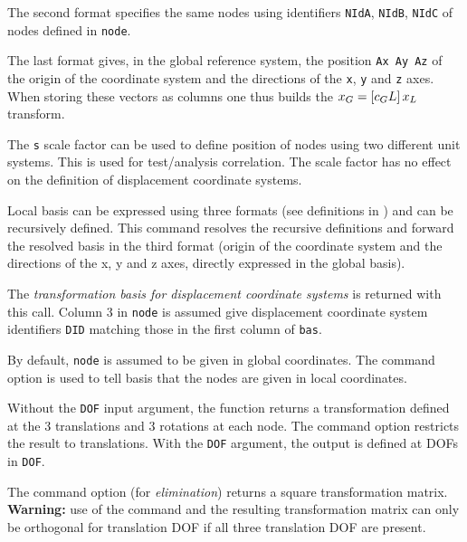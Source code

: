 The second format specifies the same nodes using identifiers {\tt NIdA}, {\tt NIdB}, {\tt NIdC} of nodes defined in {\tt node}. 

The last format gives, in the global reference system, the position {\tt Ax Ay Az} of the origin of the coordinate system and the directions of the {\tt x}, {\tt y} and {\tt z} axes. When storing these vectors as columns one thus builds the $x_G=\left[c_GL\right]x_L$ transform. 

The {\tt s} scale factor can be used to define position of nodes using two different unit systems. This is used for test/analysis correlation. The scale factor has no effect on the definition of displacement coordinate systems.


Local basis can be expressed using three formats (see definitions in ) and can be recursively defined. This command resolves the recursive definitions and forward the resolved basis in the third format (origin of the coordinate system and the directions of the x, y and z axes, directly expressed in the global basis).


The {\sl transformation basis for displacement coordinate systems} is returned with this call. Column 3 in {\tt node} is assumed give displacement coordinate system identifiers {\tt DID} matching those in the first column of {\tt bas}.

By default, {\tt node} is assumed to be given in global coordinates. The  command option is used to tell basis that the nodes are given in local coordinates.

Without the {\tt DOF} input argument, the function returns a transformation defined at the 3 translations and 3 rotations at each node. The  command option restricts the result to translations. With the {\tt DOF} argument, the output is defined at DOFs in {\tt DOF}. 

The  command option (for {\it elimination}) returns a square transformation matrix. {\bf Warning:} use of the  command and the resulting transformation matrix can only be orthogonal for translation DOF if all three translation DOF are present.




